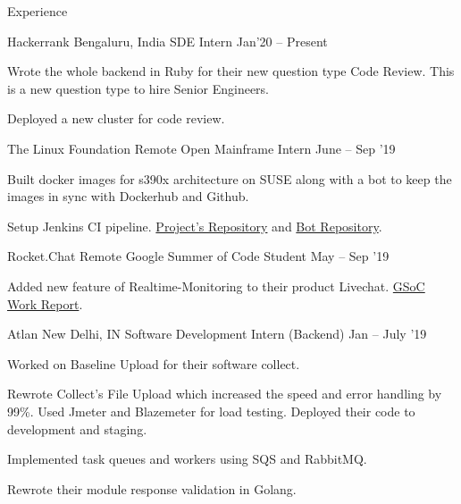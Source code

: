 \documentclass{resume} %
\begin{document}
\begin{rSection}{Experience}

  \begin{rWorkSection}{Hackerrank}
                     {Bengaluru, India}
                     {SDE Intern}
                     {Jan'20 -- Present} {
    \item Wrote the whole backend in Ruby for their new question type Code Review. This is a new question type to hire Senior Engineers. 
    \item Deployed a new cluster for code review.
  }
  \end{rWorkSection}

  \begin{rWorkSection}{The Linux Foundation}
                           {Remote}
                           {Open Mainframe Intern}
                           {June -- Sep '19}
  {
    \item Built docker images for s390x architecture on SUSE along with a bot to keep the images in sync with Dockerhub and Github.   
    \item Setup Jenkins CI pipeline. \href{https://github.com/openmainframeproject-internship/DockerHub-Development-Stacks/}{Project's Repository} and \href{https://github.com/knrt10/docker-hub-development-stacks-bot/}{Bot Repository}.  
  }                         
  \end{rWorkSection}

  \begin{rWorkSection}{Rocket.Chat}
                      {Remote}
                      {Google Summer of Code Student}
                      {May -- Sep '19}
  {
    \item Added new feature of Realtime-Monitoring to their product Livechat. \href{http://bit.ly/2kGqWt2}{GSoC Work Report}.
  }
  \end{rWorkSection}

  \begin{rWorkSection}{Atlan}
                     {New Delhi, IN}
                     {Software Development Intern (Backend)}
                     {Jan -- July '19}
  {
    \item Worked on Baseline Upload for their software collect. 
    \item Rewrote Collect's File Upload which increased the speed and error handling by 99\%. Used Jmeter and Blazemeter for load testing. Deployed their code to development and staging.
    \item Implemented task queues and workers using SQS and RabbitMQ.
    \item Rewrote their module response validation in Golang.
  }
  \end{rWorkSection}
\end{rSection}
\end{document}

